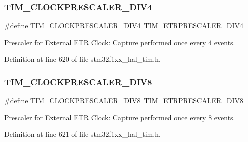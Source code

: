 \subsubsection{\texorpdfstring{T\+I\+M\+\_\+\+C\+L\+O\+C\+K\+P\+R\+E\+S\+C\+A\+L\+E\+R\+\_\+\+D\+I\+V4}{TIM\_CLOCKPRESCALER\_DIV4}}
{\footnotesize\ttfamily \#define T\+I\+M\+\_\+\+C\+L\+O\+C\+K\+P\+R\+E\+S\+C\+A\+L\+E\+R\+\_\+\+D\+I\+V4~\hyperlink{group___t_i_m___e_t_r___prescaler_gaa09da30c3cd28f1fe6b6f3f599a5212c}{T\+I\+M\+\_\+\+E\+T\+R\+P\+R\+E\+S\+C\+A\+L\+E\+R\+\_\+\+D\+I\+V4}}

Prescaler for External E\+TR Clock\+: Capture performed once every 4 events. 

Definition at line 620 of file stm32f1xx\+\_\+hal\+\_\+tim.\+h.

\mbox{\label{group___t_i_m___clock___prescaler_ga86f147be5654631b21aa391a001401d5}} 
\subsubsection{\texorpdfstring{T\+I\+M\+\_\+\+C\+L\+O\+C\+K\+P\+R\+E\+S\+C\+A\+L\+E\+R\+\_\+\+D\+I\+V8}{TIM\_CLOCKPRESCALER\_DIV8}}
{\footnotesize\ttfamily \#define T\+I\+M\+\_\+\+C\+L\+O\+C\+K\+P\+R\+E\+S\+C\+A\+L\+E\+R\+\_\+\+D\+I\+V8~\hyperlink{group___t_i_m___e_t_r___prescaler_ga834e38200874cced108379b17a24d0b7}{T\+I\+M\+\_\+\+E\+T\+R\+P\+R\+E\+S\+C\+A\+L\+E\+R\+\_\+\+D\+I\+V8}}

Prescaler for External E\+TR Clock\+: Capture performed once every 8 events. 

Definition at line 621 of file stm32f1xx\+\_\+hal\+\_\+tim.\+h.

